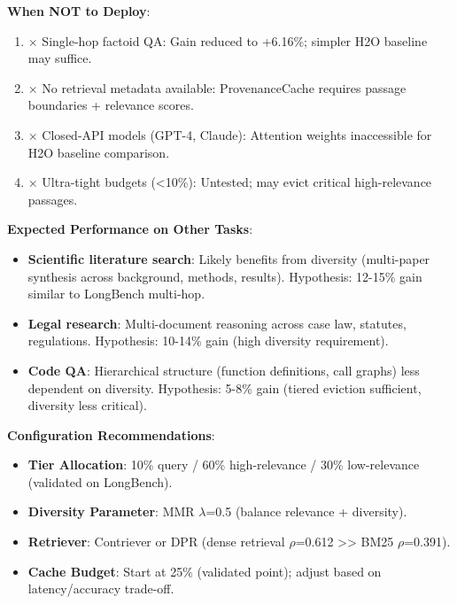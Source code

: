 \textbf{When NOT to Deploy}:
\begin{enumerate}
\item $\times$ Single-hop factoid QA: Gain reduced to +6.16\%; simpler H2O baseline may suffice.
\item $\times$ No retrieval metadata available: ProvenanceCache requires passage boundaries + relevance scores.
\item $\times$ Closed-API models (GPT-4, Claude): Attention weights inaccessible for H2O baseline comparison.
\item $\times$ Ultra-tight budgets (<10\%): Untested; may evict critical high-relevance passages.
\end{enumerate}

\textbf{Expected Performance on Other Tasks}:
\begin{itemize}
\item \textbf{Scientific literature search}: Likely benefits from diversity (multi-paper synthesis across background, methods, results). Hypothesis: 12-15\% gain similar to LongBench multi-hop.
\item \textbf{Legal research}: Multi-document reasoning across case law, statutes, regulations. Hypothesis: 10-14\% gain (high diversity requirement).
\item \textbf{Code QA}: Hierarchical structure (function definitions, call graphs) less dependent on diversity. Hypothesis: 5-8\% gain (tiered eviction sufficient, diversity less critical).
\end{itemize}

\textbf{Configuration Recommendations}:
\begin{itemize}
\item \textbf{Tier Allocation}: 10\% query / 60\% high-relevance / 30\% low-relevance (validated on LongBench).
\item \textbf{Diversity Parameter}: MMR $\lambda$=0.5 (balance relevance + diversity).
\item \textbf{Retriever}: Contriever or DPR (dense retrieval $\rho$=0.612 >> BM25 $\rho$=0.391).
\item \textbf{Cache Budget}: Start at 25\% (validated point); adjust based on latency/accuracy trade-off.
\end{itemize}
